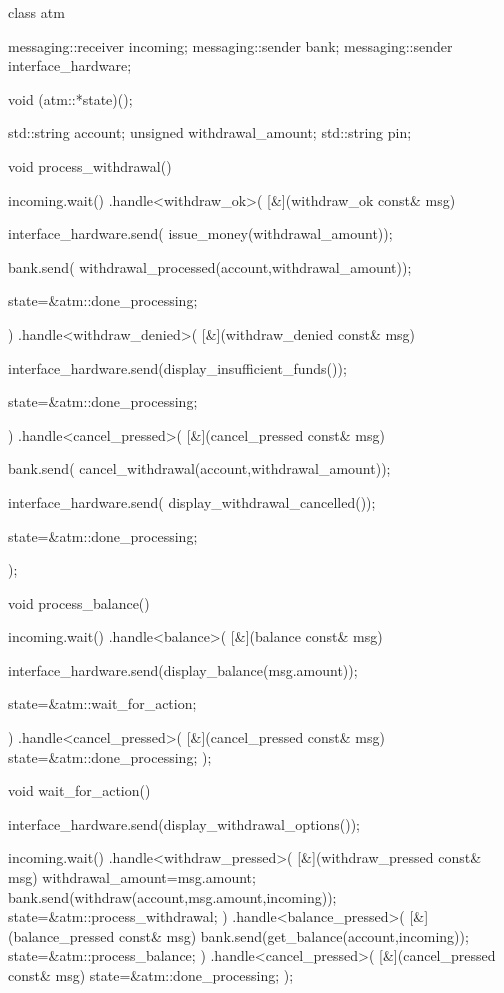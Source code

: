 \begin{cpp}
class atm
{
  messaging::receiver incoming;
  messaging::sender bank;
  messaging::sender interface_hardware;

  void (atm::*state)();

  std::string account;
  unsigned withdrawal_amount;
  std::string pin;

  void process_withdrawal()
  {
    incoming.wait()
      .handle<withdraw_ok>(
       [&](withdraw_ok const& msg)
       {
         interface_hardware.send(
           issue_money(withdrawal_amount));

         bank.send(
           withdrawal_processed(account,withdrawal_amount));

         state=&atm::done_processing;
       })
      .handle<withdraw_denied>(
       [&](withdraw_denied const& msg)
       {
         interface_hardware.send(display_insufficient_funds());

         state=&atm::done_processing;
       })
      .handle<cancel_pressed>(
       [&](cancel_pressed const& msg)
       {
         bank.send(
           cancel_withdrawal(account,withdrawal_amount));

         interface_hardware.send(
           display_withdrawal_cancelled());

         state=&atm::done_processing;
       });
   }

  void process_balance()
  {
    incoming.wait()
      .handle<balance>(
       [&](balance const& msg)
       {
         interface_hardware.send(display_balance(msg.amount));

         state=&atm::wait_for_action;
       })
      .handle<cancel_pressed>(
       [&](cancel_pressed const& msg)
       {
         state=&atm::done_processing;
       });
  }

  void wait_for_action()
  {
    interface_hardware.send(display_withdrawal_options());

    incoming.wait()
      .handle<withdraw_pressed>(
       [&](withdraw_pressed const& msg)
       {
         withdrawal_amount=msg.amount;
         bank.send(withdraw(account,msg.amount,incoming));
         state=&atm::process_withdrawal;
       })
      .handle<balance_pressed>(
       [&](balance_pressed const& msg)
       {
         bank.send(get_balance(account,incoming));
         state=&atm::process_balance;
       })
      .handle<cancel_pressed>(
       [&](cancel_pressed const& msg)
       {
         state=&atm::done_processing;
       });
  }

}
\end{cpp}
